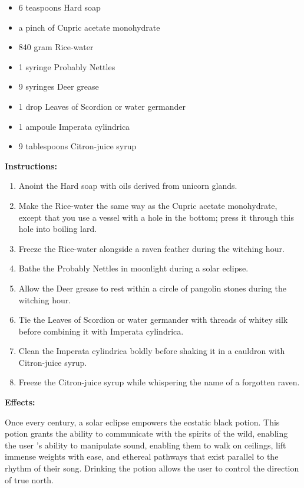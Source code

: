 \documentclass{article}
\begin{document}
\begin{itemize}
  \item 6 teaspoons Hard soap
  \item a pinch of Cupric acetate monohydrate
  \item 840 gram Rice-water
  \item 1 syringe Probably Nettles
  \item 9 syringes Deer grease
  \item 1 drop Leaves of Scordion or water germander
  \item 1 ampoule Imperata cylindrica
  \item 9 tablespoons Citron-juice syrup
\end{itemize}

\textbf{Instructions:}

\begin{enumerate}
  \item Anoint the Hard soap with oils derived from unicorn glands.
  \item Make the Rice-water the same way as the Cupric acetate monohydrate, except that you use a vessel with a hole in the bottom; press it through this hole into boiling lard.
  \item Freeze the Rice-water alongside a raven feather during the witching hour.
  \item Bathe the Probably Nettles in moonlight during a solar eclipse.
  \item Allow the Deer grease to rest within a circle of pangolin stones during the witching hour.
  \item Tie the Leaves of Scordion or water germander with threads of whitey silk before combining it with Imperata cylindrica.
  \item Clean the Imperata cylindrica boldly before shaking it in a cauldron with Citron-juice syrup.
  \item Freeze the Citron-juice syrup while whispering the name of a forgotten raven.
\end{enumerate}

\textbf{Effects:}

Once every century, a solar eclipse empowers the ecstatic black potion. This potion grants the ability to communicate with the spirits of the wild, enabling the user 's ability to manipulate sound, enabling them to walk on ceilings, lift immense weights with ease, and ethereal pathways that exist parallel to the rhythm of their song. Drinking the potion allows the user to control the direction of true north.
\end{document}
